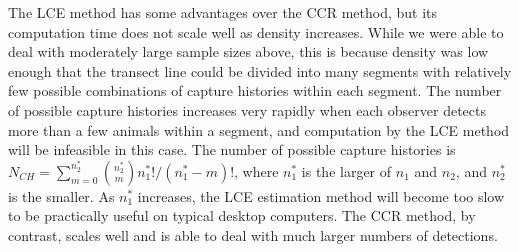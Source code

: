 \documentclass[useAMS, usenatbib, referee]{biom}\usepackage[]{graphicx}\usepackage[]{color}
\begin{document}



The LCE method has some advantages over the CCR method, but its computation time does not scale well as density increases.
While we were able to deal with moderately large sample sizes above, this is because density was low enough that the transect line could be divided into many segments with relatively few possible combinations of capture histories within each segment. The number of possible capture histories increases very rapidly when each observer detects more than a few animals within a segment, and computation by the LCE method will be infeasible in this case. The number of possible capture histories is $N_{CH}=\sum_{m=0}^{n_2^*}{n_2^*\choose m} n_1^*!/(n_1^*-m)!$, where $n_1^*$ is the larger of $n_1$ and $n_2$, and $n_2^*$ is the smaller. %
As $n_1^*$ increases, the LCE estimation method will become too slow to be practically useful on typical desktop computers. The CCR method, by contrast, scales well and is able to deal with much larger numbers of detections.

\end{document}
